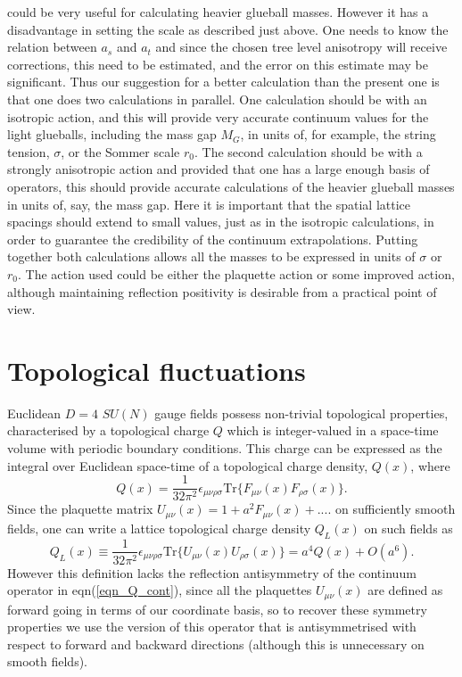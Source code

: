\documentclass[12pt]{article}
\begin{document}
could be very useful for calculating  heavier glueball masses. However it has a disadvantage
in setting the scale as described just above. One needs to know the relation between
$a_s$ and $a_t$ and since the chosen tree level anisotropy will receive corrections, this need
to be estimated, and the error on this estimate may be significant. Thus our suggestion for a
better calculation than the present one is that one does two calculations in parallel. One 
calculation should be with an isotropic action, and this will provide very accurate continuum
values for the light glueballs, including the mass gap $M_G$, in units of, for example,
the string tension, $\sigma$, or the Sommer scale $r_0$. The second calculation should be
with a strongly anisotropic action and provided that one has a large enough basis of operators,
this should provide accurate calculations of the heavier glueball masses in units of, say,
the mass gap. Here it is important that the spatial lattice spacings should extend to small
values, just as in the isotropic calculations, in order to guarantee the credibility of the
continuum extrapolations. Putting together both calculations allows all the masses to be expressed
in units of $\sigma$ or $r_0$. The action used could be either the plaquette action or some
improved action, although maintaining reflection positivity is desirable from a practical
point of view.


%
%
%
%
\section{Topological fluctuations}
\label{section_topology}

Euclidean $D=4$ $SU(N)$ gauge fields possess non-trivial
topological properties, characterised by a topological charge $Q$ which is integer-valued 
in a space-time volume with periodic boundary conditions. This charge can be expressed
as the integral over Euclidean space-time of a topological charge density, $Q(x)$, where
%
\begin{equation}
Q(x)= \frac{1}{32\pi^2} \epsilon_{\mu\nu\rho\sigma}
\mathrm{Tr}\{F_{\mu\nu}(x)F_{\rho\sigma}(x)\}.
\label{eqn_Q_cont}
\end{equation}
Since the plaquette matrix $U_{\mu\nu}(x) = 1 + a^2 F_{\mu\nu}(x) + ....$ on sufficiently
smooth fields, one can write a lattice topological charge density $Q_L(x)$ on
such fields as
%
\begin{equation}
Q_L(x) \equiv {\frac{1}{32\pi^2}} \epsilon_{\mu\nu\rho\sigma}
\mathrm{Tr}\{U_{\mu\nu}(x)U_{\rho\sigma}(x)\}
= a^4 Q(x) +O(a^6).        
\label{eqn_Q_lat}
\end{equation}
However this definition lacks the reflection antisymmetry of the continuum operator
in eqn(\ref{eqn_Q_cont}), since all the plaquettes $U_{\mu\nu}(x)$ are defined as forward
going in terms of our coordinate basis, so to recover these symmetry properties
we use the version of this operator that is antisymmetrised with respect to forward
and backward directions
\cite{DiVecchia-FFD}
(although this is unnecessary on smooth fields). 
\end{document}
